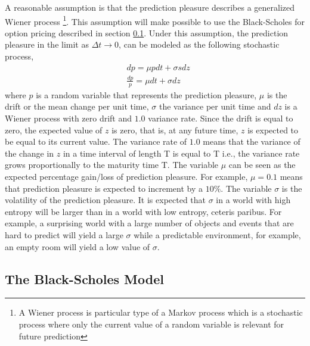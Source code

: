 \documentclass[11pt, onecolumn]{article}
\begin{document}
A reasonable assumption is that the prediction pleasure describes a generalized Wiener process \footnote{A Wiener process is particular type of a Markov process which is a stochastic process where only the current value of a random variable is relevant for future prediction}. This assumption will make possible to use the  Black-Scholes for option pricing described in section \ref{}. 
Under this assumption, the prediction pleasure in the limit as $\Delta t \to 0$, can be modeled as the following stochastic process, 
\begin{equation*}
\begin{split}
& dp = \mu p dt + \sigma s dz \\
& \frac{dp}{p}= \mu dt + \sigma dz
\end{split}
\label{eq:wiener}
\end{equation*}
where $p$ is a random variable that represents the prediction pleasure, $\mu$ is the drift or the mean change per unit time, $\sigma$ the variance per unit time and $dz$ is a Wiener process with zero drift and $1.0$ variance rate. Since the drift is equal to zero, the expected value of $z$ is zero, that is, at any future time, $z$ is expected to be equal to its current value. The variance rate of $1.0$ means that the variance of the change in $z$ in a
time interval of length T is equal to T i.e., the variance rate grows proportionally to the maturity time T. 
The variable $\mu$ can be seen as the expected percentage gain/loss of prediction pleasure. For example, $\mu = 0.1$ means that prediction pleasure is expected to increment by a $10\%$. The variable $\sigma$ is the volatility of the prediction pleasure. It is expected that $\sigma$ in a world with high entropy will be larger than in a world with low entropy, ceteris paribus. For example, a surprising world with a large number of objects and events that are hard to predict will yield a large $\sigma$ while a predictable environment, for example, an empty room will yield a low value of $\sigma$. 


\subsection{The Black-Scholes Model}
\end{document}
